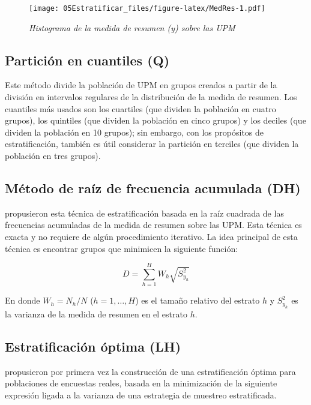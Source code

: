 \documentclass[
  12pt,
]{book}
\begin{document}
\begin{figure}
\centering
\texttt{[image: 05Estratificar\_files/figure-latex/MedRes-1.pdf]}
\caption{\label{fig:MedRes}\emph{Histograma de la medida de resumen (y) sobre las UPM}}
\end{figure}

\hypertarget{particiuxf3n-en-cuantiles-q}{%
\subsection{Partición en cuantiles (Q)}\label{particiuxf3n-en-cuantiles-q}}

Este método divide la población de UPM en grupos creados a partir de la división en intervalos regulares de la distribución de la medida de resumen. Los cuantiles más usados son los cuartiles (que dividen la población en cuatro grupos), los quintiles (que dividen la población en cinco grupos) y los deciles (que dividen la población en 10 grupos); sin embargo, con los propósitos de estratificación, también es útil considerar la partición en terciles (que dividen la población en tres grupos).

\hypertarget{muxe9todo-de-rauxedz-de-frecuencia-acumulada-dh}{%
\subsection{Método de raíz de frecuencia acumulada (DH)}\label{muxe9todo-de-rauxedz-de-frecuencia-acumulada-dh}}

\citet{Dalenius_Hodges_1959} propusieron esta técnica de estratificación basada en la raíz cuadrada de las frecuencias acumuladas de la medida de resumen sobre las UPM. Esta técnica es exacta y no requiere de algún procedimiento iterativo. La idea principal de esta técnica es encontrar grupos que minimicen la siguiente función:

\[
D = \sum_{h=1}^H W_h \sqrt{S^2_{y_{h}}}
\]

En donde \(W_h = N_h/N\) (\(h = 1, \ldots, H\)) es el tamaño relativo del estrato \(h\) y \(S^2_{y_{h}}\) es la varianza de la medida de resumen en el estrato \(h\).

\hypertarget{estratificaciuxf3n-uxf3ptima-lh}{%
\subsection{Estratificación óptima (LH)}\label{estratificaciuxf3n-uxf3ptima-lh}}

\citet{Lavallee_Hidiroglou_1988} propusieron por primera vez la construcción de una estratificación óptima para poblaciones de encuestas reales, basada en la minimización de la siguiente expresión ligada a la varianza de una estrategia de muestreo estratificada.
\end{document}

